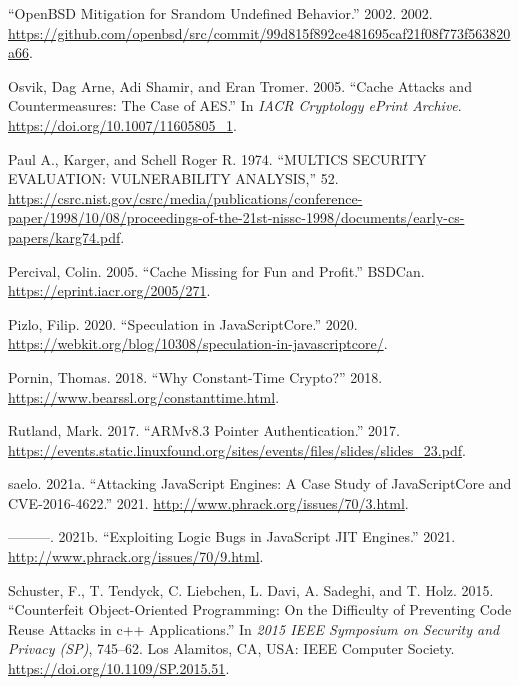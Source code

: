 \documentclass[
  a4paper,
]{report}
\newlength{\cslhangindent}
\newlength{\cslentryspacingunit} %
\newenvironment{CSLReferences}[2] %
 {%
  \setlength{\parindent}{0pt}
  \ifodd #1
  \let\oldpar\par
  \def\par{\hangindent=\cslhangindent\oldpar}
  \fi
  \setlength{\parskip}{#2\cslentryspacingunit}
 }%
 {}
\begin{document}
\begin{CSLReferences}{1}{0}
\leavevmode{}%
{``OpenBSD Mitigation for Srandom Undefined Behavior.''} 2002. 2002.
\url{https://github.com/openbsd/src/commit/99d815f892ce481695caf21f08f773f563820a66}.

\leavevmode{}%
Osvik, Dag Arne, Adi Shamir, and Eran Tromer. 2005. {``Cache Attacks and
Countermeasures: The Case of AES.''} In \emph{IACR Cryptology ePrint
Archive}. \url{https://doi.org/10.1007/11605805_1}.

\leavevmode{}%
Paul A., Karger, and Schell Roger R. 1974. {``MULTICS SECURITY
EVALUATION: VULNERABILITY ANALYSIS,''} 52.
\url{https://csrc.nist.gov/csrc/media/publications/conference-paper/1998/10/08/proceedings-of-the-21st-nissc-1998/documents/early-cs-papers/karg74.pdf}.

\leavevmode{}%
Percival, Colin. 2005. {``Cache Missing for Fun and Profit.''} BSDCan.
\url{https://eprint.iacr.org/2005/271}.

\leavevmode{}%
Pizlo, Filip. 2020. {``Speculation in JavaScriptCore.''} 2020.
\url{https://webkit.org/blog/10308/speculation-in-javascriptcore/}.

\leavevmode{}%
Pornin, Thomas. 2018. {``Why Constant-Time Crypto?''} 2018.
\url{https://www.bearssl.org/constanttime.html}.

\leavevmode{}%
Rutland, Mark. 2017. {``ARMv8.3 Pointer Authentication.''} 2017.
\url{https://events.static.linuxfound.org/sites/events/files/slides/slides_23.pdf}.

\leavevmode{}%
saelo. 2021a. {``Attacking JavaScript Engines: A Case Study of
JavaScriptCore and CVE-2016-4622.''} 2021.
\url{http://www.phrack.org/issues/70/3.html}.

\leavevmode{}%
---------. 2021b. {``Exploiting Logic Bugs in JavaScript JIT Engines.''}
2021. \url{http://www.phrack.org/issues/70/9.html}.

\leavevmode{}%
Schuster, F., T. Tendyck, C. Liebchen, L. Davi, A. Sadeghi, and T. Holz.
2015. {``Counterfeit Object-Oriented Programming: On the Difficulty of
Preventing Code Reuse Attacks in c++ Applications.''} In \emph{2015 IEEE
Symposium on Security and Privacy (SP)}, 745--62. Los Alamitos, CA, USA:
IEEE Computer Society. \url{https://doi.org/10.1109/SP.2015.51}.


\end{CSLReferences}
\end{document}
